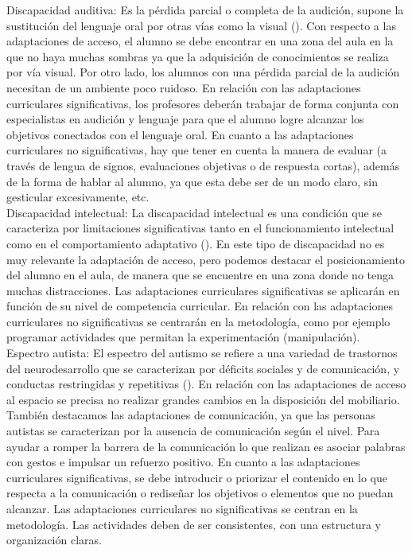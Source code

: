 Discapacidad auditiva: Es la pérdida parcial o completa de la audición, supone la sustitución del lenguaje oral por otras vías como la visual (\citeauthor{disAuditiva}). Con respecto a las adaptaciones de acceso, el alumno se debe encontrar en una zona del aula en la que no haya muchas sombras ya que la adquisición de conocimientos se realiza por vía visual. Por otro lado, los alumnos con una pérdida parcial de la audición necesitan de un ambiente poco ruidoso. En relación con las adaptaciones curriculares significativas, los profesores deberán trabajar de forma conjunta con especialistas en audición y lenguaje para que el alumno logre alcanzar los objetivos conectados con el lenguaje oral. En cuanto a las adaptaciones curriculares no significativas, hay que tener en cuenta la manera de evaluar (a través de lengua de signos, evaluaciones objetivas o de respuesta cortas), además de la forma de hablar al alumno, ya que esta debe ser de un modo claro, sin gesticular excesivamente, etc.
\\

Discapacidad intelectual: La discapacidad intelectual es una condición que se caracteriza por limitaciones significativas tanto en el funcionamiento intelectual como en el comportamiento adaptativo (\citeauthor{disIntelectual}). En este tipo de discapacidad no es muy relevante la adaptación de acceso, pero podemos destacar el posicionamiento del alumno en el aula, de manera que se encuentre en una zona donde no tenga muchas distracciones. Las adaptaciones curriculares significativas se aplicarán en función de su nivel de competencia curricular. En relación con las adaptaciones curriculares no significativas se centrarán en la metodología, como por ejemplo programar actividades que permitan la experimentación (manipulación).
\\

Espectro autista: El espectro del autismo se refiere a una variedad de trastornos del neurodesarrollo que se caracterizan por déficits sociales y de comunicación, y conductas restringidas y repetitivas (\citeauthor{espectroAutista}). En relación con las adaptaciones de acceso al espacio se precisa no realizar grandes cambios en la disposición del mobiliario. También destacamos las adaptaciones de comunicación, ya que las personas autistas se caracterizan por la ausencia de comunicación según el nivel. Para ayudar a romper la barrera de la comunicación lo que realizan es asociar palabras con gestos e impulsar un refuerzo positivo. En cuanto a las adaptaciones curriculares significativas, se debe introducir o priorizar el contenido en lo que respecta a la  comunicación o rediseñar los objetivos o elementos que no puedan alcanzar. Las adaptaciones curriculares no significativas se centran en la metodología. Las actividades deben de ser consistentes, con una estructura y organización claras.
\\

